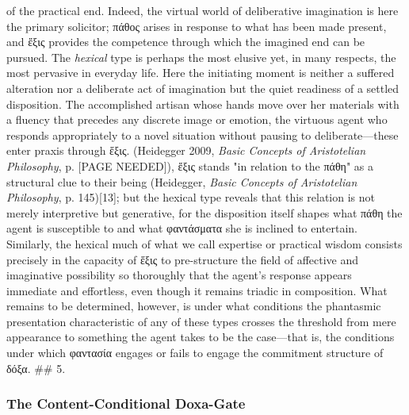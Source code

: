 \documentclass{article}
\begin{document}
of the practical end. Indeed, the virtual world of deliberative imagination is here the primary solicitor; πάθος arises in response to what has been made present, and ἕξις provides the competence through which the imagined end can be pursued. The \textit{hexical} type is perhaps the most elusive yet, in many respects, the most pervasive in everyday life. Here the initiating moment is neither a suffered alteration nor a deliberate act of imagination but the quiet readiness of a settled disposition. The accomplished artisan whose hands move over her materials with a fluency that precedes any discrete image or emotion, the virtuous agent who responds appropriately to a novel situation without pausing to deliberate—these enter praxis through ἕξις. (Heidegger 2009, \textit{Basic Concepts of Aristotelian Philosophy}, p. [PAGE NEEDED]), ἕξις stands "in relation to the πάθη" as a structural clue to their being (Heidegger, \textit{Basic Concepts of Aristotelian Philosophy}, p. 145)[13]; but the hexical type reveals that this relation is not merely interpretive but generative, for the disposition itself shapes what πάθη the agent is susceptible to and what φαντάσματα she is inclined to entertain. Similarly, the hexical much of what we call expertise or practical wisdom consists precisely in the capacity of ἕξις to pre-structure the field of affective and imaginative possibility so thoroughly that the agent's response appears immediate and effortless, even though it remains triadic in composition. What remains to be determined, however, is under what conditions the phantasmic presentation characteristic of any of these types crosses the threshold from mere appearance to something the agent takes to be the case—that is, the conditions under which φαντασία engages or fails to engage the commitment structure of δόξα. ## 5. 

\subsubsection*{The Content-Conditional Doxa-Gate}
\end{document}

